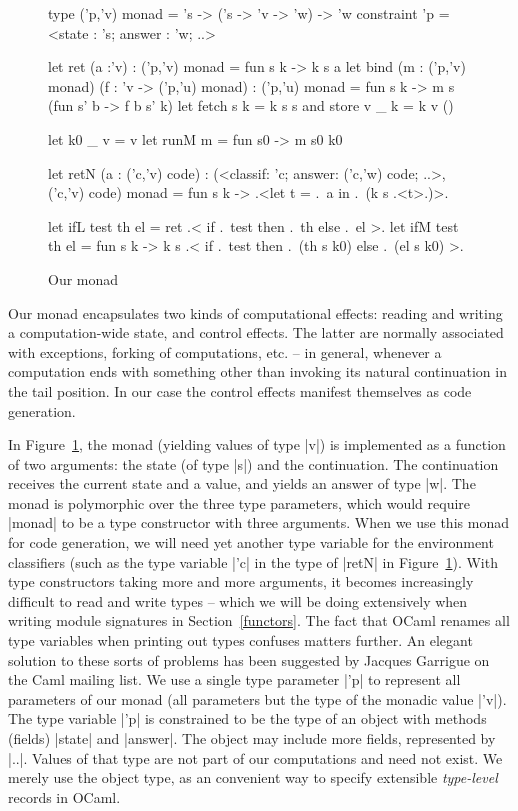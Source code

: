 \documentclass{elsart}
\begin{document}
\begin{figure}
\begin{code}
type ('p,'v) monad = 's -> ('s -> 'v -> 'w) -> 'w
    constraint 'p = <state : 's; answer : 'w; ..>

let ret (a :'v) : ('p,'v) monad = fun s k -> k s a
let bind (m : ('p,'v) monad) (f : 'v -> ('p,'u) monad) : ('p,'u) monad
  = fun s k -> m s (fun s' b -> f b s' k)
let fetch s k = k s s  and  store v _ k = k v ()

let k0 _ v = v
let runM m = fun s0 -> m s0 k0 

let retN (a : ('c,'v) code) : 
 (<classif: 'c; answer: ('c,'w) code; ..>,('c,'v) code) monad 
   = fun s k -> .<let t = .~a in .~(k s .<t>.)>.

let ifL test th el = ret .< if .~test then .~th else .~el >.
let ifM test th el = fun s k -> 
  k s .< if .~test then .~(th s k0) else .~(el s k0) >.
\end{code}
\caption{Our monad}\label{ourmonad}
\end{figure}

Our monad encapsulates two kinds of computational effects: reading and
writing a computation-wide state, and control effects. The latter are
normally associated with exceptions, forking of computations, etc. --
in general, whenever a computation ends with something other than
invoking its natural continuation in the tail position. In our case
the control effects manifest themselves as code generation.

In Figure~\ref{ourmonad}, the monad (yielding values of type |v|)
is implemented as a function of two
arguments: the state (of type |s|) and the continuation. The
continuation receives the current state and a value, and
yields an answer of type |w|.  The monad is polymorphic over the
three type parameters, which would require |monad| to be a type
constructor with three arguments. When we use this monad for code
generation, we will need yet another type variable for the environment
classifiers \cite{taha-environment} (such as the type variable |'c| 
in the type of |retN| in Figure~\ref{ourmonad}).
With type constructors taking more
and more arguments, it becomes increasingly difficult to read and write
types -- which we will be doing extensively when writing module
signatures in Section~\ref{functors}. The fact that OCaml renames all type
variables when printing out types confuses matters further. An elegant
solution to these sorts of problems has been suggested by 
Jacques Garrigue on the Caml mailing list.
%
We use a single type parameter |'p| to
represent all parameters of our monad (all parameters but the type of
the monadic value |'v|). The type variable |'p| is constrained to be
the type of an object with methods (fields) |state| and |answer|. The
object may include more fields, represented by |..|. Values of that
type are not part of our computations and need not exist. We merely
use the object type, as an convenient way to specify extensible
\emph{type-level} records in OCaml.     
\end{document}
